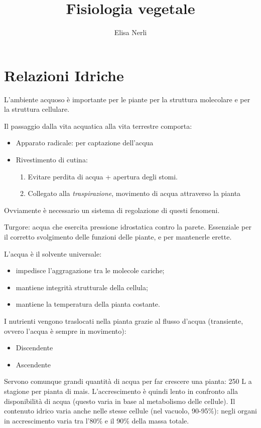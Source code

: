 \documentclass[a4paper,12pt]{book}
\begin{document}
\author{Elisa Nerli}
\title{Fisiologia vegetale}
\maketitle
\newpage
\tableofcontents
\newpage




\chapter{Relazioni Idriche}
L'ambiente acquoso è importante per le piante per la struttura molecolare e per la struttura cellulare.

Il passaggio dalla vita acquatica alla vita terrestre comporta:
\begin{itemize}
   \item{Apparato radicale: per captazione dell'acqua} 
    \item{Rivestimento di cutina: 
    \begin{enumerate} 
    \item{Evitare perdita di acqua + apertura degli stomi.}
    \item{Collegato alla \emph{traspirazione}, movimento di acqua attraverso la pianta}
    \end{enumerate}}
\end{itemize}
Ovviamente è necessario un sistema di regolazione di questi fenomeni.

Turgore: acqua che esercita pressione idrostatica contro la parete. Essenziale per il corretto svolgimento delle funzioni delle piante, e per mantenerle erette.


L'acqua è il solvente universale:
\begin{itemize}
    \item{impedisce l'aggragazione tra le molecole cariche;}
    \item{mantiene integrità strutturale della cellula;}
    \item{mantiene la temperatura della pianta costante.}
\end{itemize}

I nutrienti vengono traslocati nella pianta grazie al flusso d'acqua (transiente, ovvero l'acqua è sempre in movimento):
\begin{itemize}
\item{Discendente}
\item{Ascendente}
\end{itemize}

Servono comunque grandi quantità di acqua per far crescere una pianta: 250 L a stagione per pianta di mais.
L'accrescimento è quindi lento in confronto alla disponibilità di acqua (questo varia in base al metabolismo delle cellule).
Il contenuto idrico varia anche nelle stesse cellule (nel vacuolo, 90-95\%): negli organi in accrescimento varia tra l'80\% e il 90\% della massa totale.
 
\end{document}
